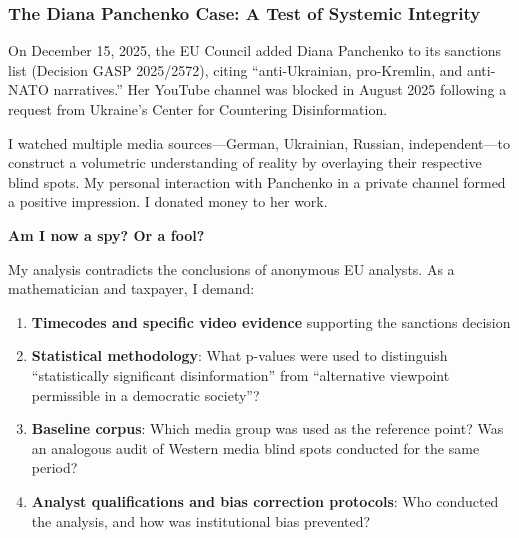 \documentclass[11pt,a4paper]{article}
\theoremstyle{definition}
\theoremstyle{remark}
\begin{document}
\subsubsection*{The Diana Panchenko Case: A Test of Systemic Integrity}

On December 15, 2025, the EU Council added Diana Panchenko to its sanctions list (Decision GASP 2025/2572), citing ``anti-Ukrainian, pro-Kremlin, and anti-NATO narratives.'' Her YouTube channel was blocked in August 2025 following a request from Ukraine's Center for Countering Disinformation.

I watched multiple media sources—German, Ukrainian, Russian, independent—to construct a volumetric understanding of reality by overlaying their respective blind spots. My personal interaction with Panchenko in a private channel formed a positive impression. I donated money to her work.

\textbf{Am I now a spy? Or a fool?}

My analysis contradicts the conclusions of anonymous EU analysts. As a mathematician and taxpayer, I demand:

\begin{enumerate}
\item \textbf{Timecodes and specific video evidence} supporting the sanctions decision
\item \textbf{Statistical methodology}: What p-values were used to distinguish ``statistically significant disinformation'' from ``alternative viewpoint permissible in a democratic society''?
\item \textbf{Baseline corpus}: Which media group was used as the reference point? Was an analogous audit of Western media blind spots conducted for the same period?
\item \textbf{Analyst qualifications and bias correction protocols}: Who conducted the analysis, and how was institutional bias prevented?
\end{enumerate}

\begin{center}
\end{center}
\end{document}
